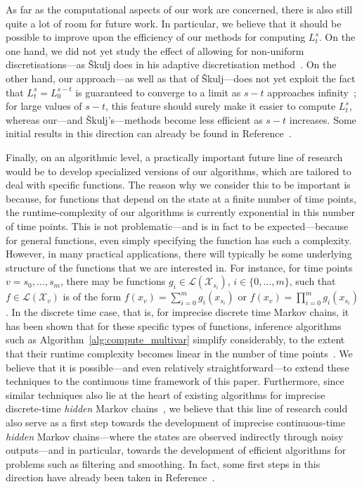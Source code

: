 \documentclass[10pt,a4paper]{paper}
\theoremstyle{definition}
\newcommand{\states}{\mathcal{X}}
\newcommand{\gambles}{\mathcal{L}}
\begin{document}
As far as the computational aspects of our work are concerned, there is also still quite a lot of room for future work. In particular, we believe that it should be possible to improve upon the efficiency of our methods for computing $L_t^s$. On the one hand, we did not yet study the effect of allowing for non-uniform discretisations---as \v{S}kulj does in his adaptive discretisation method~\cite{Skulj:2015cq}. On the other hand, our approach---as well as that of \v{S}kulj---does not yet exploit the fact that $L_t^s=L_0^{s-t}$ is guaranteed to converge to a limit as $s-t$ approaches infinity~\cite{DeBock:2016}; for large values of $s-t$, this feature should surely make it easier to compute $L_t^s$, whereas our---and \v{S}kulj's---methods become less efficient as $s-t$ increases. Some initial results in this direction can already be found in Reference~\cite{Krak:2017}.


Finally, on an algorithmic level, a practically important future line of research would be to develop specialized versions of our algorithms, which are tailored to deal with specific functions. The reason why we consider this to be important is because, for functions that depend on the state at a finite number of time points, the runtime-complexity of our algorithms is currently exponential in this number of time points. This is not problematic---and is in fact to be expected---because for general functions, even simply specifying the function has such a complexity. However, in many practical applications, there will typically be some underlying structure of the functions that we are interested in. For instance, for time points $v=s_0,\ldots,s_m$, there may be functions $g_i\in\gambles(\states_{s_i})$, $i\in\{0,\ldots,m\}$, such that $f\in\gambles(\states_v)$ is of the form $f(x_v) = \sum_{i=0}^m g_i(x_{s_i})$ or $f(x_v) = \prod_{i=0}^m g_i(x_{s_i})$.
In the discrete time case, that is, for imprecise discrete time Markov chains, it has been shown that for these specific types of functions, inference algorithms such as Algorithm~\ref{alg:compute_multivar} simplify considerably, to the extent that their runtime complexity becomes linear in the number of time points~\cite{de2015credal,Lopatatzidis2015}. We believe that it is possible---and even relatively straightforward---to extend these techniques to the continuous time framework of this paper. Furthermore, since similar techniques also lie at the heart of existing algorithms for imprecise discrete-time \emph{hidden} Markov chains~\cite{Benavoli:2011ei,DeBock:2014ts}, we believe that this line of research could also serve as a first step towards the development of imprecise continuous-time \emph{hidden} Markov chains---where the states are observed indirectly through noisy outputs---and in particular, towards the development of efficient algorithms for problems such as filtering and smoothing. In fact, some first steps in this direction have already been taken in Reference~\cite{Krak:2017}.
\end{document}

